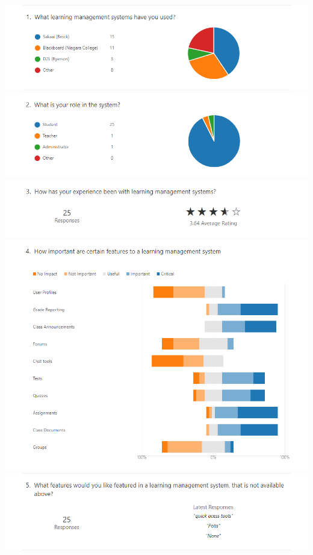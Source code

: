 \documentclass[12pt]{article}
\begin{document}
    \includegraphics[width=\textwidth]{survey/1.png}
    \includegraphics[width=\textwidth]{survey/2.png}
    \includegraphics[width=\textwidth]{survey/3.png}
    \includegraphics[width=\textwidth]{survey/4.png}
    \includegraphics[width=\textwidth]{survey/5.png}
\end{document}
